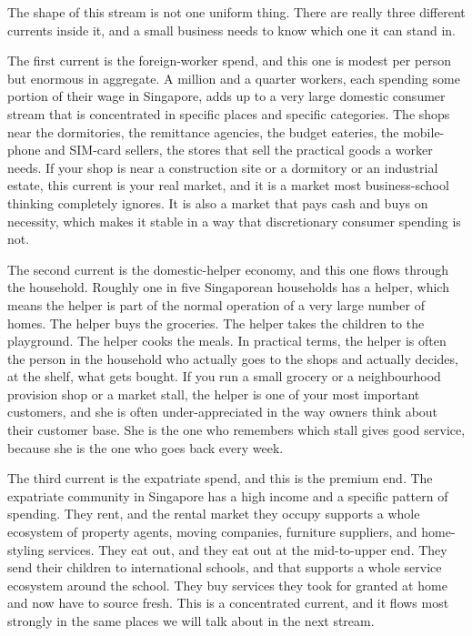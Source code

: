 \documentclass[10pt,twoside,openany]{memoir}
\begin{document}
{{{{{{{{{{{{{{The shape of this stream is not one uniform thing. There are really
three different currents inside it, and a small business needs to know
which one it can stand in.

The first current is the foreign-worker spend, and this one is modest
per person but enormous in aggregate. A million and a quarter workers,
each spending some portion of their wage in Singapore, adds up to a very
large domestic consumer stream that is concentrated in specific places
and specific categories. The shops near the dormitories, the remittance
agencies, the budget eateries, the mobile-phone and SIM-card sellers,
the stores that sell the practical goods a worker needs. If your shop is
near a construction site or a dormitory or an industrial estate, this
current is your real market, and it is a market most business-school
thinking completely ignores. It is also a market that pays cash and buys
on necessity, which makes it stable in a way that discretionary consumer
spending is not.

The second current is the domestic-helper economy, and this one flows
through the household. Roughly one in five Singaporean households has a
helper, which means the helper is part of the normal operation of a very
large number of homes. The helper buys the groceries. The helper takes
the children to the playground. The helper cooks the meals. In practical
terms, the helper is often the person in the household who actually goes
to the shops and actually decides, at the shelf, what gets bought. If
you run a small grocery or a neighbourhood provision shop or a market
stall, the helper is one of your most important customers, and she is
often under-appreciated in the way owners think about their customer
base. She is the one who remembers which stall gives good service,
because she is the one who goes back every week.

The third current is the expatriate spend, and this is the premium end.
The expatriate community in Singapore has a high income and a specific
pattern of spending. They rent, and the rental market they occupy
supports a whole ecosystem of property agents, moving companies,
furniture suppliers, and home-styling services. They eat out, and they
eat out at the mid-to-upper end. They send their children to
international schools, and that supports a whole service ecosystem
around the school. They buy services they took for granted at home and
now have to source fresh. This is a concentrated current, and it flows
most strongly in the same places we will talk about in the next stream.

}}}}}}}}}}}}}}
\end{document}
